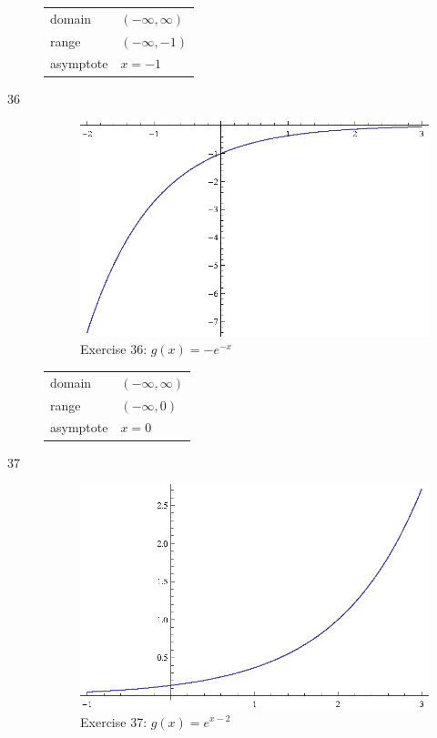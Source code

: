 \documentclass{exam}
\begin{document}
\begin{description}
        \begin{tabular}[H]{ll}
          \toprule
          domain    & $(-\infty, \infty)$ \\
          range     & $(-\infty, -1)$ \\
          asymptote & $x = -1$ \\
          \bottomrule
        \end{tabular}

      \item[36] 
        \begin{figure}[H]
          \centering
          \includegraphics[scale=1.0]{exercise36.eps}
          \caption*{Exercise 36: $g(x) = -e^{-x}$}
        \end{figure}

        \begin{tabular}[H]{ll}
          \toprule
          domain    & $(-\infty, \infty)$ \\
          range     & $(-\infty, 0)$ \\
          asymptote & $x = 0$ \\
          \bottomrule
        \end{tabular}

      \item[37] 
        \begin{figure}[H]
          \centering
          \includegraphics[scale=1.0]{exercise37.eps}
          \caption*{Exercise 37: $g(x) = e^{x - 2}$}
        \end{figure}


\end{description}
\end{document}
